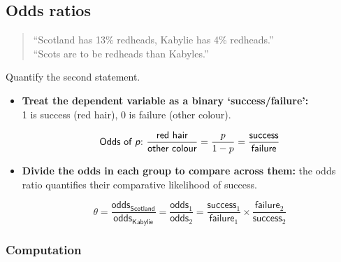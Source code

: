 \documentclass[t]{beamer}
\begin{document}
	
	
	

	\subsection{Odds ratios}

	\begin{frame}[t]{}
					
		\begin{quote}
		``Scotland has 13\% redheads, Kabylie has 4\% redheads.''\\
		``Scots are  to be redheads than Kabyles.''
		\end{quote}
		
		Quantify the second statement.

		\begin{itemize}
			\item \textbf{Treat the dependent variable as a binary `success/failure':}\\1 is success (red hair), 0 is failure (other colour).
						
			$$\textsf{Odds of \textit{p}:~}\frac{\textsf{red hair}}{\textsf{other colour}}=\frac{p}{1-p}=\frac{\textsf{success}}{\textsf{failure}}$$
			\vspace{0em}
			
			\item \textbf{Divide the odds in each group to compare across them:} the odds ratio quantifies their comparative likelihood of success.
			
			$$\theta = \frac{\textsf{odds}_{\textsf{Scotland}}}{\textsf{odds}_{\textsf{Kabylie}}}=\frac{\textsf{odds}_1}{\textsf{odds}_2}=\frac{\textsf{success}_1}{\textsf{failure}_1}\times\frac{\textsf{failure}_2}{\textsf{success}_2}$$
						
		\end{itemize}

	\end{frame}
	
	\subsubsection{Computation}
\end{document}
